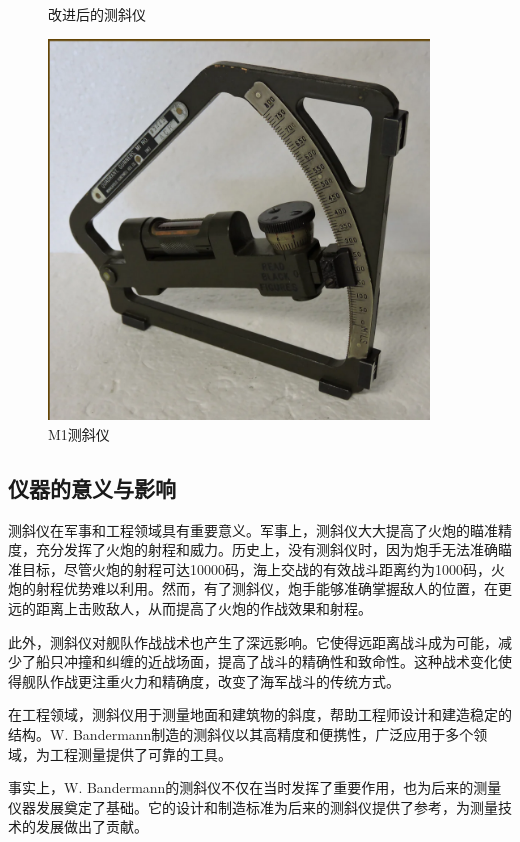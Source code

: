 \documentclass[UTF8]{ctexart}
\begin{document}
\begin{figure}[h]
\begin{minipage}[t]{0.3\textwidth}
        \caption{改进后的测斜仪}
        \label{fig:Artillery-clinometer}
    \end{minipage}
    \begin{minipage}[t]{0.3\textwidth}
        \centering
        \includegraphics[width=0.9\textwidth]{img/M1-clinometer.png}
        \caption{M1测斜仪}
        \label{fig:M1-clinometer}
    \end{minipage}
\end{figure}

\subsection{仪器的意义与影响}

测斜仪在军事和工程领域具有重要意义。军事上，测斜仪大大提高了火炮的瞄准精度，充分发挥了火炮的射程和威力。历史上，没有测斜仪时，因为炮手无法准确瞄准目标，尽管火炮的射程可达10000码，海上交战的有效战斗距离约为1000码，火炮的射程优势难以利用。然而，有了测斜仪，炮手能够准确掌握敌人的位置，在更远的距离上击败敌人，从而提高了火炮的作战效果和射程。\cite{RangeFindersByGleaves1892}

此外，测斜仪对舰队作战战术也产生了深远影响。它使得远距离战斗成为可能，减少了船只冲撞和纠缠的近战场面，提高了战斗的精确性和致命性。这种战术变化使得舰队作战更注重火力和精确度，改变了海军战斗的传统方式。\cite{RangeFindersByGleaves1892}

在工程领域，测斜仪用于测量地面和建筑物的斜度，帮助工程师设计和建造稳定的结构。W. Bandermann制造的测斜仪以其高精度和便携性，广泛应用于多个领域，为工程测量提供了可靠的工具。

事实上，W. Bandermann的测斜仪不仅在当时发挥了重要作用，也为后来的测量仪器发展奠定了基础。它的设计和制造标准为后来的测斜仪提供了参考，为测量技术的发展做出了贡献。



\end{document}

